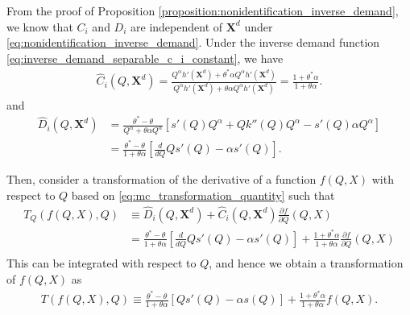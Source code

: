 \documentclass[11pt, a4paper]{article}
\begin{document}
From the proof of Proposition \ref{proposition:nonidentification_inverse_demand}, we know that $C_i$ and $D_i$ are independent of $\bm{X}^{d}$ under \eqref{eq:nonidentification_inverse_demand}.
Under the inverse demand function \eqref{eq:inverse_demand_separable_c_i_constant}, we have
\begin{align}
    \hat{C}_i(Q, \bm{X}^{d}) = \frac{Q^{\alpha}h'(\bm{X}^{d}) + \theta^{*}\alpha Q^{\alpha}h'(\bm{X}^{d})}{Q^{\alpha}h'(\bm{X}^{d}) + \theta \alpha Q^{\alpha}h'(\bm{X}^{d})} = \frac{1 + \theta^{*}\alpha}{1 + \theta\alpha}.
\end{align}
and
\begin{align}
    \hat{D}_i(Q, \bm{X}^{d}) & = \frac{\theta^{*} - \theta}{Q^{\alpha} + \theta \alpha Q^{\alpha}} \left[ s'(Q)Q^{\alpha} + Qk''(Q) Q^{\alpha} - s'(Q)\alpha Q^{\alpha} \right]\\
    &= \frac{\theta^{*} - \theta}{1 + \theta\alpha} \left[\frac{d}{dQ}Qs'(Q)  -\alpha s'(Q) \right].
\end{align}


Then, consider a transformation of the derivative of a function $f(Q, X)$ with respect to $Q$ based on \eqref{eq:mc_transformation_quantity} such that
\begin{align}
    T_Q\left(f(Q,X), Q\right) & \equiv \hat{D}_i(Q, \bm{X}^{d}) + \hat{C}_i(Q, \bm{X}^{d}) \frac{\partial f}{\partial Q}(Q, X)\\
    & = \frac{\theta^{*} - \theta}{1 + \theta\alpha} \left[\frac{d}{dQ}Qs'(Q)  -\alpha s'(Q) \right] + \frac{1 + \theta^{*}\alpha}{1 + \theta\alpha} \frac{\partial f}{\partial Q}(Q, X)\\
\end{align}
This can be integrated with respect to $Q$, and hence we obtain a transformation of $f(Q, X)$ as
\begin{align}
    T\left(f(Q,X), Q\right) \equiv \frac{\theta^{*} - \theta}{1 + \theta\alpha} \left[Qs'(Q) - \alpha s(Q) \right] + \frac{1 + \theta^{*}\alpha}{1 + \theta\alpha} f(Q, X).
\end{align}
\end{document}
